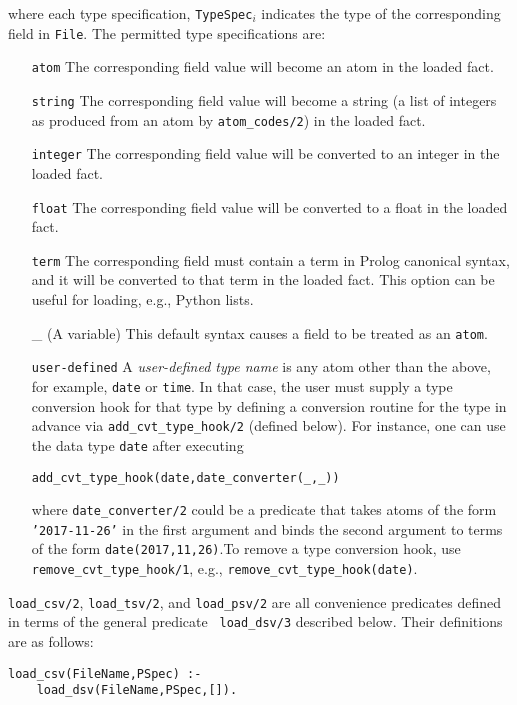 \begin{description}
where each type specification, {\tt TypeSpec$_i$} indicates the type
of the corresponding field in {\tt File}.  The permitted type
specifications are:
\begin{itemize}
\item[{\tt atom}] The corresponding field value will become an atom in
the loaded fact.
\item[{\tt string}] The corresponding field value will become a string
  (a list of integers as produced from an atom by {\tt atom\_codes/2})
  in the loaded fact.
\item[{\tt integer}] The corresponding field value will be converted
to an integer in the loaded fact.
\item[{\tt float}] The corresponding field value will be converted to
a float in the loaded fact.
\item[{\tt term}] The corresponding field must contain a term in
  Prolog canonical syntax, and it will be converted to that term in
  the loaded fact.  This option can be useful for loading, e.g.,
  Python lists.
\item[\_] (A variable) This default syntax causes a field to be
  treated as an {\tt atom}.
\item[{\tt user-defined}]
%
  A \emph{user-defined type name} is any atom other than the above,
  for example, \texttt{date} or \texttt{time}.  In that case, the user
  must supply a type conversion hook for that type by defining a
  conversion routine for the type in advance via
  \texttt{add\_cvt\_type\_hook/2} (defined below).  For instance, one
  can use the data type \texttt{date} after executing
  
  \texttt{add\_cvt\_type\_hook(date,date\_converter(\_,\_))}

  where \texttt{date\_converter/2} could be a predicate that takes
  atoms of the form \texttt{'2017-11-26'} in the first argument and
  binds the second argument to terms of the form
  \texttt{date(2017,11,26)}.To remove a type conversion hook, use
  \texttt{remove\_cvt\_type\_hook/1}, e.g.,
  \texttt{remove\_cvt\_type\_hook(date)}.
\end{itemize}

{\tt load\_csv/2}, {\tt load\_tsv/2}, and {\tt load\_psv/2} are all
convenience predicates defined in terms of the general predicate {\tt
  load\_dsv/3} described below.  Their definitions are as follows:

\begin{verbatim}
load_csv(FileName,PSpec) :-
    load_dsv(FileName,PSpec,[]).
	

\end{verbatim}
\end{description}
